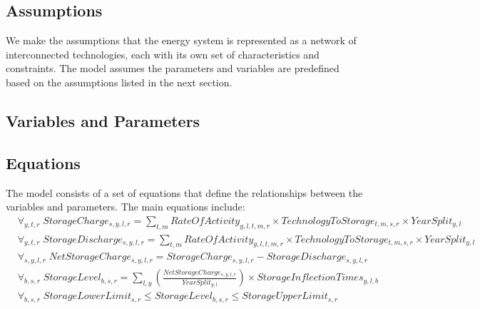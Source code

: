 \documentclass[11pt]{article}
\begin{document}
\subsection{Assumptions}
We make the assumptions that the energy system is represented as a network of interconnected technologies, each with its own set of characteristics and constraints. The model assumes the parameters and variables are predefined based on the assumptions listed in the next section.

\subsection{Variables and Parameters}
\subsection{Equations}
The model consists of a set of equations that define the relationships between the variables and parameters. The main equations include:
\begin{align}
&\forall_{y,t,r} \; StorageCharge_{s,y,l,r} = 
\sum_{t,m} RateOfActivity_{y,l,t,m,r} 
\times TechnologyToStorage_{t,m,s,r} \times YearSplit_{y,l} \\[1em]
%
&\forall_{y,t,r} \; StorageDischarge_{s,y,l,r} = 
\sum_{t,m} RateOfActivity_{y,l,t,m,r} 
\times TechnologyToStorage_{t,m,s,r} \times YearSplit_{y,l} \\[1em]
%
&\forall_{s,y,l,r} \; NetStorageCharge_{s,y,l,r} = 
StorageCharge_{s,y,l,r} - StorageDischarge_{s,y,l,r} \\[1em]
%
&\forall_{b,s,r} \; StorageLevel_{b,s,r} = 
\sum_{l,y} \left( \frac{NetStorageCharge_{s,y,l,r}}{YearSplit_{y,l}} \right) 
\times StorageInflectionTimes_{y,l,b} \\[1em]
%
&\forall_{b,s,r} \; StorageLowerLimit_{s,r} \leq StorageLevel_{b,s,r} 
\leq StorageUpperLimit_{s,r}
\end{align}
\end{document}

